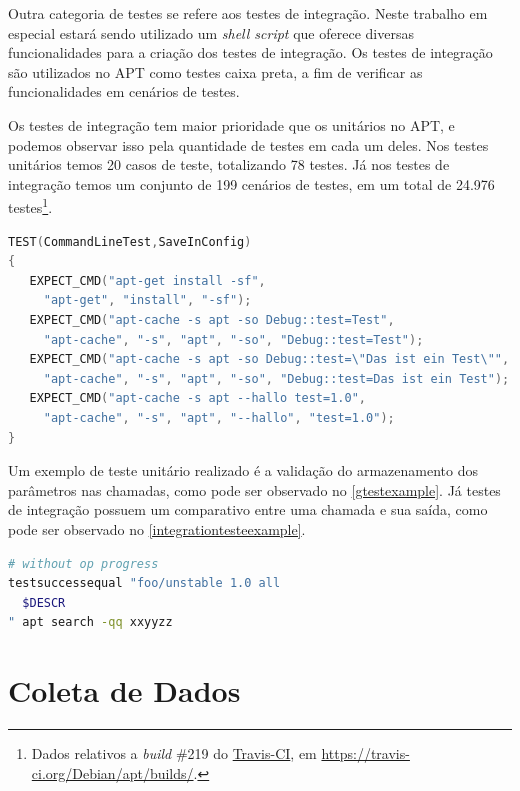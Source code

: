 Outra categoria de testes se refere aos testes de integração. Neste trabalho em especial estará sendo utilizado um \textit{shell script} que oferece diversas funcionalidades para a criação dos testes de integração. Os testes de integração são utilizados no {\code APT} como testes caixa preta, a fim de verificar as funcionalidades em cenários de testes.

Os testes de integração tem maior prioridade que os unitários no APT, e podemos observar isso pela quantidade de testes em cada um deles. Nos testes unitários temos 20 casos de teste, totalizando 78 testes. Já nos testes de integração temos um conjunto de 199 cenários de testes, em um total de 24.976 testes\footnote{Dados relativos a \textit{build} \#219 do \href{https://travis-ci.org/Debian/apt/builds/}{Travis-CI}, em \url{https://travis-ci.org/Debian/apt/builds/}.}.


\begin{lstlisting}[language=C++,label=gtestexample,caption={Teste de validação de armazenamento de parâmetros}]
TEST(CommandLineTest,SaveInConfig)
{
   EXPECT_CMD("apt-get install -sf",
	 "apt-get", "install", "-sf");
   EXPECT_CMD("apt-cache -s apt -so Debug::test=Test",
	 "apt-cache", "-s", "apt", "-so", "Debug::test=Test");
   EXPECT_CMD("apt-cache -s apt -so Debug::test=\"Das ist ein Test\"",
	 "apt-cache", "-s", "apt", "-so", "Debug::test=Das ist ein Test");
   EXPECT_CMD("apt-cache -s apt --hallo test=1.0",
	 "apt-cache", "-s", "apt", "--hallo", "test=1.0");
}
\end{lstlisting}

Um exemplo de teste unitário realizado é a validação do armazenamento dos parâmetros nas chamadas, como pode ser observado no \autoref{gtestexample}. Já testes de integração possuem um comparativo entre uma chamada e sua saída, como pode ser observado no \autoref{integrationtesteexample}.

\begin{lstlisting}[language=Bash,label=integrationtesteexample,caption={Teste de verificação de saída para busca}]
# without op progress
testsuccessequal "foo/unstable 1.0 all
  $DESCR
" apt search -qq xxyyzz
\end{lstlisting}



\section{Coleta de Dados} %
\label{cha:coleta_de_dados}

